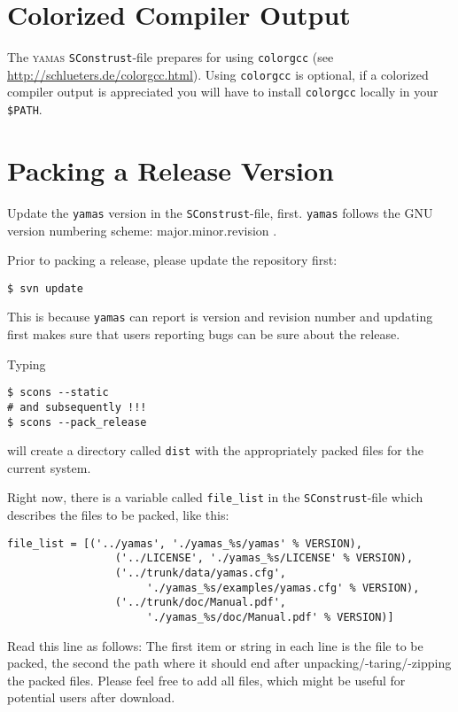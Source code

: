 \section{Colorized Compiler Output}

The \textsc{yamas} \texttt{SConstrust}-file prepares for using \texttt{colorgcc} (see \url{http://schlueters.de/colorgcc.html}). Using \texttt{colorgcc} is optional, if a colorized compiler output is appreciated you will have to install \texttt{colorgcc} locally in your \texttt{\$PATH}.

\section{Packing a Release Version}
\alert{Update the \texttt{yamas} version in the \texttt{SConstrust}-file, first. \texttt{yamas} follows the GNU version numbering scheme: major.minor.revision .}

Prior to packing a release, please update the repository first:
\begin{lstlisting}[style=shell]
$ svn update
\end{lstlisting}
This is because \texttt{yamas} can report is version and revision number and updating first makes sure that users reporting bugs can be sure about the release.

Typing
\begin{lstlisting}[style=shell]
$ scons --static
# and subsequently !!!
$ scons --pack_release
\end{lstlisting}
will create a directory called \texttt{dist} with the appropriately packed files for the current system. 

Right now, there is a variable called \verb+file_list+ in the \texttt{SConstrust}-file which describes the files to be packed, like this:
\begin{lstlisting}[style=python]
 file_list = [('../yamas', './yamas_%s/yamas' % VERSION),
                 ('../LICENSE', './yamas_%s/LICENSE' % VERSION),
                 ('../trunk/data/yamas.cfg', 
                      './yamas_%s/examples/yamas.cfg' % VERSION),
                 ('../trunk/doc/Manual.pdf', 
                      './yamas_%s/doc/Manual.pdf' % VERSION)]
\end{lstlisting}
Read this line as follows: The first item or string in each line is the file to be packed, the second the path where it should end after unpacking/-taring/-zipping the packed files. Please feel free to add all files, which might be useful for potential users after download.

